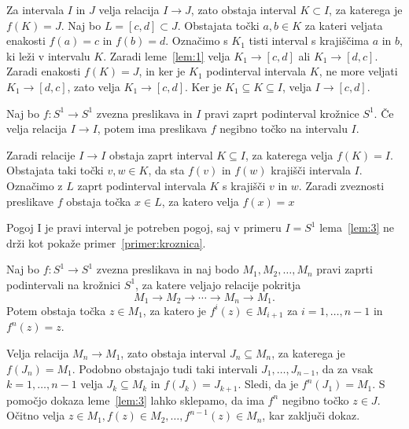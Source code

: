 \documentclass[../TG_magistrsko_delo_sections.tex]{subfiles}
\begin{document}
\begin{dokaz}
Za intervala $I$ in $J$ velja relacija $I \to J$, zato obstaja interval $K \subset I$, za katerega je $f(K) = J$. Naj bo $L = [c, d]  \subset J$. Obstajata točki $a, b \in K$ za kateri veljata enakosti $f(a) = c$ in $f(b)=d$. Označimo s $K_1$ tisti interval s krajiščima $a$ in $b$, ki leži v intervalu $K$. Zaradi leme~\ref{lem:1} velja $K_1 \to [c, d]$ ali $K_1 \to [d, c]$. Zaradi enakosti $f(K) = J$, in ker je $K_1$ podinterval intervala $K$, ne more veljati $K_1 \to [d, c]$, zato velja $K_1 \to [c, d]$. Ker je $K_1 \subseteq K \subseteq I$, velja $I \to [c, d]$.
\end{dokaz}

\begin{lema}\label{lem:3}		%
Naj bo $f \colon S^1 \to S^1$ zvezna preslikava in $I$ pravi zaprt podinterval krožnice $S^1$. Če velja relacija $I \to I$, potem ima preslikava $f$ negibno točko na intervalu $I$.
\end{lema}

\begin{dokaz}
Zaradi relacije $I \to I$ obstaja zaprt interval $K \subseteq I$, za katerega velja $f(K) = I$. Obstajata taki točki $v, w \in K$, da sta $f(v)$ in $f(w)$ krajišči intervala $I$. Označimo z $L$ zaprt podinterval intervala $K$ s krajišči $v$ in $w$. Zaradi zveznosti preslikave $f$ obstaja točka $x \in L$, za katero velja $f(x) = x$
\end{dokaz}

\begin{opomba}
Pogoj I je pravi interval je potreben pogoj, saj v primeru $I=S^1$ lema~\ref{lem:3} ne drži kot pokaže primer~\ref{primer:kroznica}.
\end{opomba}

\begin{lema}\label{lem:4}				%
Naj bo $f \colon S^1 \to S^1$ zvezna preslikava in naj bodo $M_1, M_2, \dots, M_n$ pravi zaprti podintervali na krožnici $S^1$, za katere veljajo relacije pokritja 
$$M_1 \to M_2 \to \cdots \to M_n \to M_1.$$ 
Potem obstaja točka $z \in M_1$, za katero je $f^i(z) \in M_{i+1}$ za $i = 1, \dots, n-1$ in $f^n(z) =z$. 
\end{lema}

\begin{dokaz}
Velja relacija $M_n \to M_1$, zato obstaja interval $J_n \subseteq M_n$, za katerega je $f(J_n) = M_1$. Podobno obstajajo tudi taki intervali $J_1, \dots, J_{n-1}$, da za vsak $k = 1, \dots, n-1$ velja $J_k \subseteq M_k$ in $f(J_k) = J_{k+1}$. Sledi, da je $f^n(J_1) = M_1$. S pomočjo dokaza leme~\ref{lem:3} lahko sklepamo, da ima $f^n$ negibno točko $z \in J$. Očitno velja $z \in M_1, f(z) \in M_2, \dots, f^{n-1}(z) \in M_n$, kar zaključi dokaz.
\end{dokaz}
\end{document}
